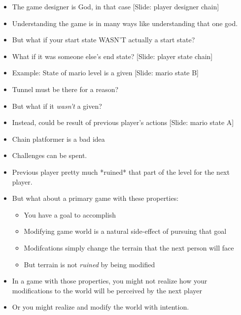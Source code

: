 \documentclass[12pt]{article}
\begin{document}
{\begin{itemize}
\item The game designer is God, in that case [Slide: player designer chain]

\item Understanding the game is in many ways like understanding that one god.

\item But what if your start state WASN'T actually a start state?

\item What if it was someone else's end state? [Slide: player state chain]

\item Example:  State of mario level is a given [Slide: mario state B]

\item Tunnel must be there for a reason?

\item But what if it {\em wasn't} a given? 

\item Instead, could be result of previous player's actions [Slide: mario state A]

\item Chain platformer is a bad idea

\item Challenges can be spent.

\item Previous player pretty much *ruined* that part of the level for the next player.

\item But what about a primary game with these properties:
\begin{itemize}
\item You have a goal to accomplish 
\item Modifying game world is a natural side-effect of pursuing that goal
\item Modifcations simply change the terrain that the next person will face
\item But terrain is not {\em ruined} by being modified
\end{itemize}

\item In a game with those properties, you might not realize how your modifications to the world will be perceived by the next player

\item Or you might realize and modify the world with intention.



\end{itemize}}
\end{document}
